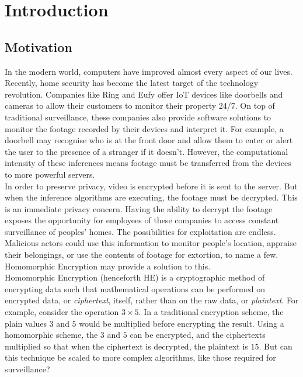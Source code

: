 \chapter{Introduction}
\label{chap:introduction}

\section{Motivation}
\label{sec:motivation}
\setlength{\leftskip}{0.5cm}
\indent \indent
In the modern world, computers have improved almost every aspect of our lives. Recently, home security has become the latest target of the technology revolution. Companies like Ring \cite{RING} and Eufy \cite{EUFY} offer IoT devices like doorbells and cameras to allow their customers to monitor their property 24/7. On top of traditional surveillance, these companies also provide software solutions to monitor the footage recorded by their devices and interpret it. For example, a doorbell may recognise who is at the front door and allow them to enter or alert the user to the presence of a stranger if it doesn't. However, the computational intensity of these inferences means footage must be transferred from the devices to more powerful servers. 
\smallskip \\ \indent
In order to preserve privacy, video is encrypted before it is sent to the server. But when the inference algorithms are executing, the footage must be decrypted. This is an immediate privacy concern. Having the ability to decrypt the footage exposes the opportunity for employees of these companies to access constant surveillance of peoples' homes. The possibilities for exploitation are endless. Malicious actors could use this information to monitor people's location, appraise their belongings, or use the contents of footage for extortion, to name a few. Homomorphic Encryption may provide a solution to this.
\smallskip \\ \indent
Homomorphic Encryption (henceforth HE) is a cryptographic method of encrypting data such that mathematical operations can be performed on encrypted data, or \textit{ciphertext}, itself, rather than on the raw data, or \textit{plaintext}. For example, consider the operation $3 \times 5$. In a traditional encryption scheme, the plain values $3$ and $5$ would be multiplied before encrypting the result. Using a homomorphic scheme, the $3$ and $5$ can be encrypted, and the ciphertexts multiplied so that when the ciphertext is decrypted, the plaintext is $15$. But can this technique be scaled to more complex algorithms, like those required for surveillance?

